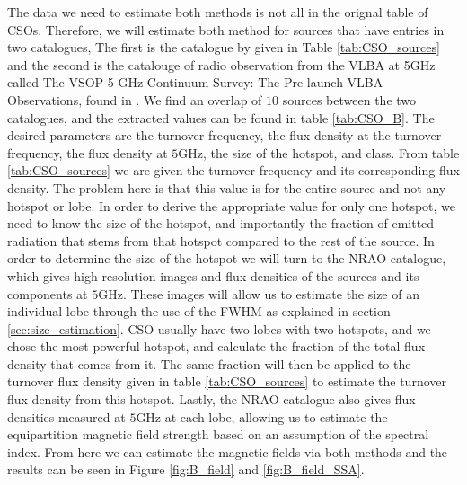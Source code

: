 The data we need to estimate both methods is not all in the orignal table of CSOs. Therefore, we will estimate both method for sources that have entries in two catalogues, The first is the catalogue by \cite{kiehlmann2023compact} given in Table \ref{tab:CSO_sources} and the second is the catalouge of radio observation from the VLBA at 5GHz called The VSOP 5 GHz Continuum Survey: The Pre-launch VLBA Observations, found in \cite{nrao1996}. We find an overlap of $10$ sources between the two catalogues, and the extracted values can be found in table \ref{tab:CSO_B}. The desired parameters are the turnover frequency, the flux density at the turnover frequency, the flux density at $5$GHz, the size of the hotspot, and class. From table \ref{tab:CSO_sources} we are given the turnover frequency and its corresponding flux density. The problem here is that this value is for the entire source and not any hotspot or lobe. In order to derive the appropriate value for only one hotspot, we need to know the size of the hotspot, and importantly the fraction of emitted radiation that stems from that hotspot compared to the rest of the source. In order to determine the size of the hotspot we will turn to the NRAO catalogue, which gives high resolution images and flux densities of the sources and its components at $5$GHz. These images will allow us to estimate the size of an individual lobe through the use of the FWHM as explained in section \ref{sec:size_estimation}. CSO usually have two lobes with two hotspots, and we chose the most powerful hotspot, and calculate the fraction of the total flux density that comes from it. The same fraction will then be applied to the turnover flux density given in table \ref{tab:CSO_sources} to estimate the turnover flux density from this hotspot. Lastly, the NRAO catalogue also gives flux densities measured at $5$GHz at each lobe, allowing us to estimate the equipartition magnetic field strength based on an assumption of the spectral index. From here we can estimate the magnetic fields via both methods and the results can be seen in Figure \ref{fig:B_field} and \ref{fig:B_field_SSA}.






